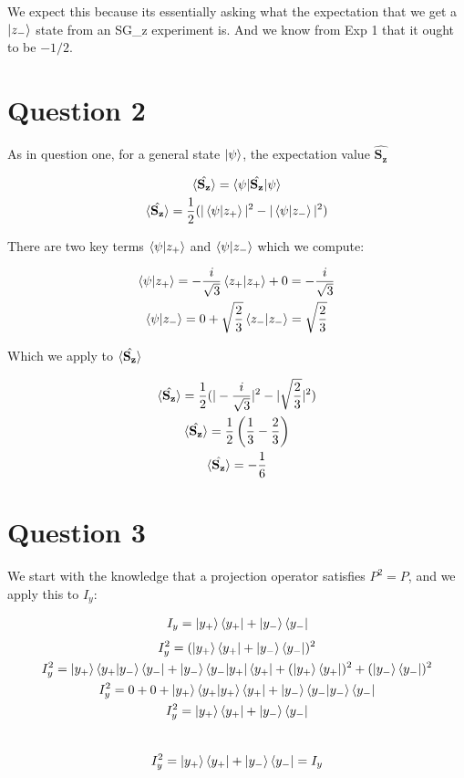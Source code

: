 \documentclass{article}
\let\oldhat\hat
\renewcommand{\hat}[1]{\oldhat{\mathbf{#1}}}
\begin{document}
    We expect this because its essentially asking what the expectation that we get a $\ket{z_-}$ state
    from an SG\_z experiment is. And we know from Exp 1 that it ought to be $-1/2$.


\section{Question 2}

    As in question one, for a general state $\ket{\psi}$, the expectation value $\hat{S_z}$

    \begin{gather}
        \braket{\hat{S_z}} = \braket{\psi|\hat{S_z}|\psi}\\
        \braket{\hat{S_z}} = \frac{1}{2}(|\braket{\psi|z_+}|^2 - |\braket{\psi|z_-}|^2)
    \end{gather}

    There are two key terms $\braket{\psi|z_+}$ and $\braket{\psi|z_-}$ which we compute:

    \begin{gather}
        \braket{\psi|z_+} = -\frac{i}{\sqrt{3}}\braket{z_+|z_+} + 0 = -\frac{i}{\sqrt{3}}\\
        \braket{\psi|z_-} = 0 + \sqrt{\frac{2}{3}}\braket{z_-|z_-} = \sqrt{\frac{2}{3}}
    \end{gather}

    Which we apply to $\braket{\hat{S_z}}$

    \begin{gather}
        \braket{\hat{S_z}} = \frac{1}{2}(|-\frac{i}{\sqrt{3}}|^2 - |\sqrt{\frac{2}{3}}|^2)\\
        \braket{\hat{S_z}} = \frac{1}{2}\left( \frac{1}{3} - \frac{2}{3} \right)\\
        \braket{\hat{S_z}} = -\frac{1}{6}
    \end{gather}



\section{Question 3}

    We start with the knowledge that a projection operator satisfies $P^2 = P$,
    and we apply this to $I_y$:

    \begin{gather}
        I_y = \ket{y_+}\bra{y_+} + \ket{y_-}\bra{y_-}
    \end{gather}
    \begin{gather*}
        I_y^2 = (\ket{y_+}\bra{y_+} + \ket{y_-}\bra{y_-})^2\\
        I_y^2 = \ket{y_+}\braket{y_+|y_-}\bra{y_-} + \ket{y_-}\bra{y_-|y_+}\bra{y_+}
        + (\ket{y_+}\bra{y_+})^2 + (\ket{y_-}\bra{y_-})^2\\
        I_y^2 = 0 + 0 + \ket{y_+}\braket{y_+|y_+}\bra{y_+} + \ket{y_-}\braket{y_-|y_-}\bra{y_-}\\
        I_y^2 = \ket{y_+}\bra{y_+} + \ket{y_-}\bra{y_-}
    \end{gather*}\
    \begin{gather*}
        I_y^2 = \ket{y_+}\bra{y_+} + \ket{y_-}\bra{y_-} = I_y
    \end{gather*}
\end{document}
